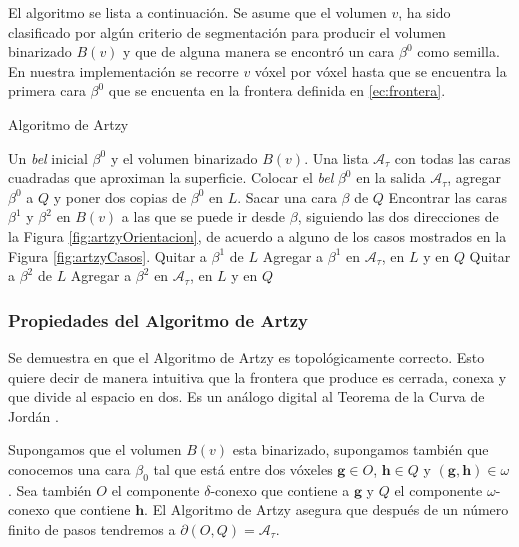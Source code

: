 El algoritmo se lista a continuación. Se asume que el volumen $v$, ha sido clasificado por algún criterio de segmentación para producir el volumen binarizado $B(v)$ y que de alguna manera se encontró un cara $\beta^0$ como semilla. En nuestra implementación se recorre $v$ vóxel por vóxel hasta que se encuentra la primera cara $\beta^{0}$ que se encuenta en la frontera definida en \eqref{ec:frontera}.

\begin{algorithm}[H]
\caption{Algoritmo de Artzy}
\label{algo:artzy}
\begin{algorithmic}[1]
\REQUIRE Un \emph{bel} inicial $\beta^0$ y el volumen binarizado $B(v)$.
\ENSURE Una lista $\mathcal{A}_{\tau}$ con todas las caras cuadradas que aproximan la superficie.
\STATE Colocar el \emph{bel} $\beta^0$ en la salida $\mathcal{A}_{\tau}$, agregar $\beta^0$ a $Q$ y poner dos copias de $\beta^0$ en $L$.
  \STATE Sacar una cara $\beta$ de $Q$
  \STATE Encontrar las caras $\beta^1$ y $\beta^2$ en $B(v)$ a las que se puede ir desde $\beta$, siguiendo las dos direcciones de la Figura \ref{fig:artzyOrientacion}, de acuerdo a alguno de los casos mostrados en la Figura \ref{fig:artzyCasos}.
    \STATE Quitar a $\beta^1$ de $L$
  \ELSE
    \STATE Agregar a $\beta^1$ en $\mathcal{A}_{\tau}$, en $L$ y en $Q$
  \ENDIF
    \STATE Quitar a $\beta^2$ de $L$
  \ELSE
    \STATE Agregar a $\beta^2$ en $\mathcal{A}_{\tau}$, en $L$ y en $Q$
  \ENDIF
\ENDWHILE

\end{algorithmic}
\end{algorithm}

\subsubsection{Propiedades del Algoritmo de Artzy}

Se demuestra en \cite{Gabor:DigitalSpaces} que el Algoritmo de Artzy es topológicamente correcto. Esto quiere decir de manera intuitiva que la frontera que produce es cerrada, conexa y que divide al espacio en dos. Es un análogo digital al Teorema de la Curva de Jordán \cite{Gabor:DigitalSpaces}.

Supongamos que el volumen $B(v)$ esta binarizado, supongamos también que conocemos una cara $\beta_0$ tal que está entre dos vóxeles $\textbf{g} \in O$, $\textbf{h} \in Q$ y $(\textbf{g}, \textbf{h}) \in \omega$. Sea también $O$ el componente $\delta$-conexo que contiene a $\textbf{g}$ y $Q$ el componente $\omega$-conexo que contiene $\textbf{h}$. El Algoritmo de Artzy asegura que después de un número finito de pasos tendremos a $\partial(O, Q) = \mathcal{A}_{\tau}$.

